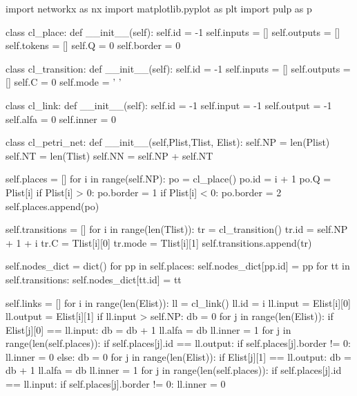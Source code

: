 \begin{python}
import networkx as nx
import matplotlib.pyplot as plt
import pulp as p

class cl_place:
    def __init__(self):
        self.id = -1
        self.inputs = []
        self.outputs = []
        self.tokens = []
        self.Q = 0
        self.border = 0


class cl_transition:
    def __init__(self):
        self.id = -1
        self.inputs = []
        self.outputs = []
        self.C = 0
        self.mode = ' '

class cl_link:
    def __init__(self):
        self.id = -1
        self.input = -1
        self.output = -1
        self.alfa = 0
        self.inner = 0

class cl_petri_net:
    def __init__(self,Plist,Tlist, Elist):
        self.NP = len(Plist)
        self.NT = len(Tlist)
        self.NN = self.NP + self.NT
            
        self.places = []
        for i in range(self.NP):
            po = cl_place()
            po.id = i + 1
            po.Q = Plist[i]
            if Plist[i] > 0:
                po.border = 1
            if Plist[i] < 0:
                po.border = 2            
            self.places.append(po)
            
       
        self.transitions = []
        for i in range(len(Tlist)):
            tr = cl_transition()
            tr.id = self.NP + 1 + i
            tr.C = Tlist[i][0]
            tr.mode = Tlist[i][1]
            self.transitions.append(tr)
        
        self.nodes_dict = dict()
        for pp in self.places:
            self.nodes_dict[pp.id] = pp
        for tt in self.transitions:
            self.nodes_dict[tt.id] = tt
        
        self.links = []
        for i in range(len(Elist)):
            ll = cl_link()
            ll.id = i
            ll.input = Elist[i][0]
            ll.output = Elist[i][1]
            if ll.input > self.NP:
                db = 0
                for j in range(len(Elist)):
                    if Elist[j][0] == ll.input:
                        db = db + 1
                ll.alfa = db
                ll.inner = 1
                for j in range(len(self.places)):
                    if self.places[j].id == ll.output:
                        if self.places[j].border != 0:
                            ll.inner = 0
            else:
                db = 0
                for j in range(len(Elist)):
                    if Elist[j][1] == ll.output:
                        db = db + 1
                ll.alfa = db
                ll.inner = 1
                for j in range(len(self.places)):
                    if self.places[j].id == ll.input:
                        if self.places[j].border != 0:
                            ll.inner = 0
            

\end{python}

